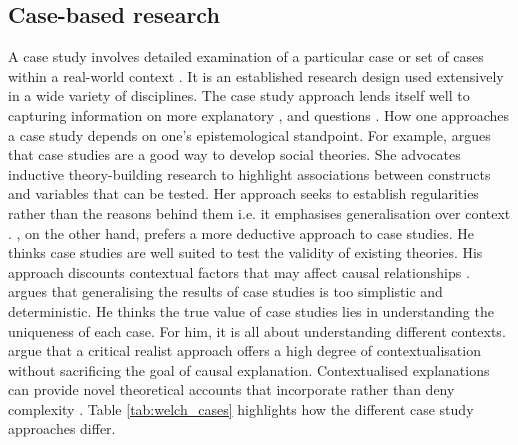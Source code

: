 \subsection{Case-based research}

A case study involves detailed examination of a particular case or set of cases within a real-world context \citep{crowe2011case}. It is an established research design used extensively in a wide variety of disciplines. The case study approach lends itself well to capturing information on more explanatory ,  and  questions \citep{crowe2011case}. How one approaches a case study depends on one's epistemological standpoint. For example, \citet{eisenhardt1989building} argues that case studies are a good way to develop social theories. She advocates inductive theory-building research to highlight associations between constructs and variables that can be tested. Her approach seeks to establish regularities rather than the reasons behind them i.e. it emphasises generalisation over context \citep{welch2011theorising}. \citet{yin2009case}, on the other hand, prefers a more deductive approach to case studies. He thinks case studies are well suited to test the validity of existing theories. His approach discounts contextual factors that may affect causal relationships \citep{welch2011theorising}. \citet{stake2005qualitative} argues that generalising the results of case studies is too simplistic and deterministic. He thinks the true value of case studies lies in understanding the uniqueness of each case. For him, it is all about understanding different contexts. \citet{welch2011theorising} argue that a critical realist approach offers a high degree of contextualisation without sacrificing the goal of causal explanation. Contextualised explanations can provide novel theoretical accounts that incorporate rather than deny complexity \citep{ragin2009reflections}. Table \ref{tab:welch_cases} highlights how the different case study approaches differ. \medskip

